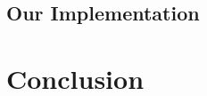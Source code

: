 \documentclass[runningheads]{llncs}
\begin{document}
\subsection{Our Implementation}





\section{Conclusion}


% 



\nocite{*}  

\newpage

\appendix



%
\end{document}

